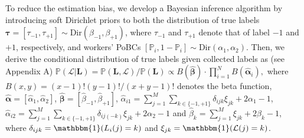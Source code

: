 \documentclass{article}
\begin{document}
To reduce the estimation bias, we develop a Bayesian inference algorithm by introducing soft Dirichlet priors to both the distribution of true labels $\bm{\tau}=[\tau_{-1},\tau_{+1}]\sim \textrm{Dir}(\beta_{-1},\beta_{+1})$, where $\tau_{-1}$ and $\tau_{+1}$ denote that of label $-1$ and $+1$, respectively, and workers' PoBCs  $[\mathbb{P}_{i}, 1-\mathbb{P}_i]\sim \textrm{Dir}(\alpha_{1},\alpha_{2})$. Then, we derive the conditional distribution of true labels given collected labels as (see Appendix A)
$\mathbb{P}(\mathcal{L}|\bm{L})=\mathbb{P}(\bm{L},\mathcal{L})/\mathbb{P}(\bm{L})\propto B(\hat{\bm{\beta}}) \cdot {\prod}_{i=1}^{N}B(\hat{\bm{\alpha}}_{i}),
$ %
%
where $B(x,y)=(x-1)!(y-1)!/(x+y-1)!$ denotes the beta function, $\hat{\bm{\alpha}}=[\hat{\alpha}_1,\hat{\alpha}_2]$, $\hat{\bm{\beta}}=[\hat{\beta}_{-1},\hat{\beta}_{+1}]$, $\hat{\alpha}_{i1}={\sum}_{j=1}^{M}{\sum}_{k\in\{-1,+1\}}\delta_{ijk}\xi_{jk}+2\alpha_{1}-1$, $\hat{\alpha}_{i2}={\sum}_{j=1}^{M}{\sum}_{k\in\{-1,+1\}}\delta_{ij(-k)}\xi_{jk}+2\alpha_{2}-1$ and $\hat{\beta}_k={\sum}_{j=1}^{M}\xi_{jk}+2\beta_{k}-1$, where $\delta_{ijk}=\mathbbm{1}(L_i(j)=k)$ and $\xi_{jk}= \mathbbm{1}(\mathcal{L}(j)=k)$. 
\end{document}
